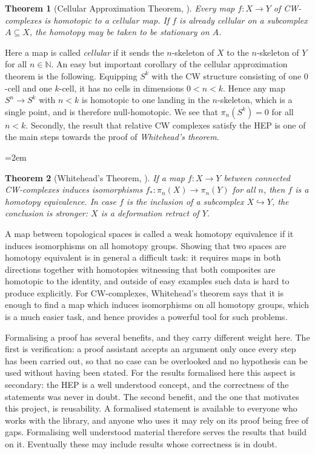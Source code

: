 \documentclass[11pt, a4paper, english]{article}
\theoremstyle{plain}
\newtheorem{theorem}{Theorem}
\theoremstyle{definition}
\theoremstyle{remark}
\numberwithin{equation}{section}
\numberwithin{theorem}{section}
\begin{document}
\begin{theorem}[Cellular Approximation Theorem, {\cite[Theorem 4.8]{HAT01}}] 
Every map $f \colon X \to Y $ of CW-complexes is homotopic to a cellular map. If $f$ is already cellular on a subcomplex $A \subseteq X$, the homotopy may be taken to be stationary on $A$.
\end{theorem} 

Here a map is called \emph{cellular} if it sends the $n$-skeleton of $X$ to the $n$-skeleton of $Y$ for all $n \in \mathbb{N}$. An easy but important corollary of the cellular approximation theorem is the following. Equipping $S^k$ with the CW structure consisting of one $0$-cell and one $k$-cell, it has no cells in dimensions $0 < n < k$. Hence any map $S^n \to S^k$ with $n < k$ is homotopic to one landing in the $n$-skeleton, which is a single point, and is therefore null-homotopic. We see that $\pi_n(S^k) = 0$ for all $n < k$. Secondly, the result that relative CW complexes satisfy the HEP is one of the main steps towards the proof of \emph{Whitehead's theorem}.
{\emergencystretch=2em
\begin{theorem}[Whitehead's Theorem, {\cite[Theorem 4.5]{HAT01}}]  \label{Whitehead}
    If a map $f \colon X \to Y$ between connected CW-complexes induces isomorphisms $f_* \colon \pi_n (X) \to  \pi _n (Y) $ for all $n$, then $f$ is a homotopy equivalence. In case $f$ is the inclusion of a subcomplex $X \hookrightarrow Y$, the conclusion is stronger: $X$ is a deformation retract of $Y$.
\end{theorem}
\par}
A map between topological spaces is called a weak homotopy equivalence if it induces isomorphisms on all homotopy groups. Showing that two spaces are homotopy equivalent is in general a difficult task: it requires maps in both directions together with homotopies witnessing that both composites are homotopic to the identity, and outside of easy examples such data is hard to produce explicitly. For CW-complexes, Whitehead's theorem says that it is enough to find a map which induces isomorphisms on all homotopy groups, which is a much easier task, and hence provides a powerful tool for such problems.

Formalising a proof has several benefits, and they carry different weight here. The first is verification: a proof assistant accepts an argument only once every step has been carried out, so that no case can be overlooked and no hypothesis can be used without having been stated. For the results formalised here this aspect is secondary: the HEP is a well understood concept, and the correctness of the statements was never in doubt. The second benefit, and the one that motivates this project, is reusability. A formalised statement is available to everyone who works with the library, and anyone who uses it may rely on its proof being free of gaps. Formalising well understood material therefore serves the results that build on it. Eventually these may include results whose correctness is in doubt.
\end{document}
